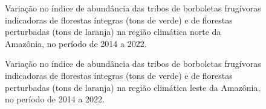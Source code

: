 \documentclass[
  letterpaper,
]{scrbook}
\begin{document}
\begin{figure}[H]


\caption{\label{fig-IA-areas-abertas-regiao-climatica-norte-amazonica}Variação
no índice de abundância das tribos de borboletas frugívoras indicadoras
de florestas íntegras (tons de verde) e de florestas perturbadas (tons
de laranja) na região climática norte da Amazônia, no período de 2014 a
2022.}

\end{figure}%

\begin{figure}[H]


\caption{\label{fig-IA-regiao-climatica-leste-amazonica}Variação no
índice de abundância das tribos de borboletas frugívoras indicadoras de
florestas íntegras (tons de verde) e de florestas perturbadas (tons de
laranja) na região climática leste da Amazônia, no período de 2014 a
2022.}

\end{figure}%
\end{document}
